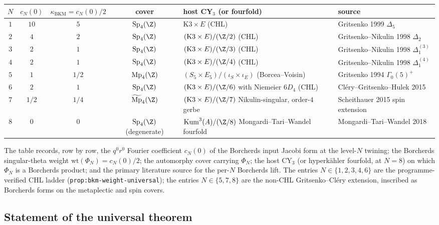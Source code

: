 \begin{center}
\begin{tabular}{c|c|c|c|l|l}
\toprule
$N$ & $c_N(0)$ & $\kappa_{\mathrm{BKM}} = c_N(0)/2$ & cover &
  host CY$_3$ (or fourfold) & source \\
\midrule
$1$ & $10$    & $5$    & $\mathrm{Sp}_4(\Z)$ &
  $\mathrm{K3} \times E$ (CHL) &
  Gritsenko 1999 $\Delta_5$ \\
$2$ & $4$     & $2$    & $\mathrm{Sp}_4(\Z)$ &
  $(\mathrm{K3} \times E)/(\Z/2)$ (CHL) &
  Gritsenko--Nikulin 1998 $\Delta_2$ \\
$3$ & $2$     & $1$    & $\mathrm{Sp}_4(\Z)$ &
  $(\mathrm{K3} \times E)/(\Z/3)$ (CHL) &
  Gritsenko--Nikulin 1998 $\Delta_1^{(3)}$ \\
$4$ & $2$     & $1$    & $\mathrm{Sp}_4(\Z)$ &
  $(\mathrm{K3} \times E)/(\Z/4)$ (CHL) &
  Gritsenko--Nikulin 1998 $\Delta_1^{(4)}$ \\
$5$ & $1$     & $1/2$  & $\mathrm{Mp}_4(\Z)$ &
  $(S_5 \times E_5)/(\iota_S \times \iota_E)$ (Borcea--Voisin) &
  Gritsenko 1994 $\Gamma_0(5)^+$ \\
$6$ & $2$     & $1$    & $\mathrm{Sp}_4(\Z)$ &
  $(\mathrm{K3} \times E)/(\Z/6)$ with Niemeier $6D_4$ (CHL) &
  Cl\'ery--Gritsenko--Hulek 2015 \\
$7$ & $1/2$   & $1/4$  & $\widetilde{\mathrm{Mp}}_4(\Z)$ &
  $(\mathrm{K3} \times E)/(\Z/7)$ Nikulin-singular,
  order-$4$ gerbe & Scheithauer 2015 spin extension \\
$8$ & $0$     & $0$    & $\mathrm{Sp}_4(\Z)$ (degenerate) &
  $\mathrm{Kum}^3(A)/(\Z/8)$ Mongardi--Tari--Wandel fourfold &
  Mongardi--Tari--Wandel 2018 \\
\bottomrule
\end{tabular}
\end{center}

The table records, row by row, the $q^0 r^0$ Fourier coefficient
$c_N(0)$ of the Borcherds input Jacobi form at the level-$N$
twining; the Borcherds singular-theta weight
$\mathrm{wt}(\Phi_N) = c_N(0)/2$; the automorphy cover carrying
$\Phi_N$; the host CY$_3$ (or hyperk\"ahler fourfold, at $N = 8$)
on which $\Phi_N$ is a Borcherds product; and the primary
literature source for the per-$N$ Borcherds lift. The entries
$N \in \{1, 2, 3, 4, 6\}$ are the programme-verified CHL ladder
(\texttt{prop:bkm-weight-universal}); the entries
$N \in \{5, 7, 8\}$ are the non-CHL Gritsenko--Cl\'ery extension,
inscribed as Borcherds forms on the metaplectic and spin covers.

\subsection*{Statement of the universal theorem}

